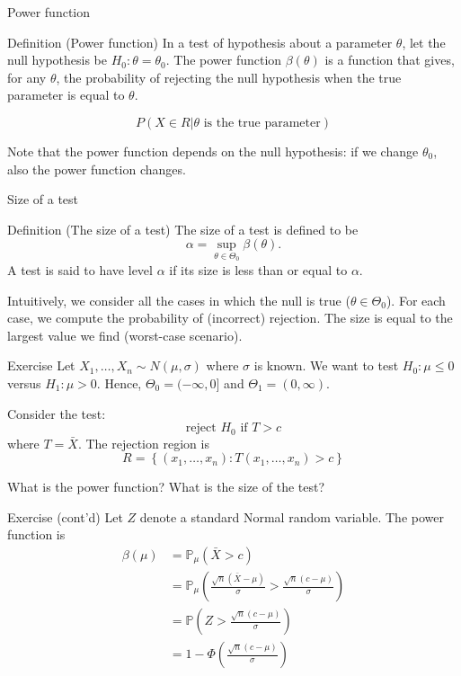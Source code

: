 \documentclass[
  ignorenonframetext,
]{beamer}
\begin{document}
\begin{frame}{Power function}
\protect{}\label{power-function}
\begin{block}{Definition (Power function)}
\protect{}\label{definition-power-function}
In a test of hypothesis about a parameter \(\theta\), let the null
hypothesis be \(H_0:\theta = \theta_0\). The power function
\(\beta(\theta)\) is a function that gives, for any \(\theta\), the
probability of rejecting the null hypothesis when the true parameter is
equal to \(\theta\).

\[
P(X\in R |\theta \text{ is the true parameter})
\]
\end{block}

Note that the power function depends on the null hypothesis: if we
change \(\theta_0\), also the power function changes.
\end{frame}

\begin{frame}{Size of a test}
\protect{}\label{size-of-a-test}
\begin{block}{Definition (The size of a test)}
\protect{}\label{definition-the-size-of-a-test}
The size of a test is defined to be \[
\alpha=\sup _{\theta \in \Theta_{0}} \beta(\theta) .
\] A test is said to have level \(\alpha\) if its size is less than or
equal to \(\alpha\).
\end{block}

Intuitively, we consider all the cases in which the null is true
(\(\theta \in \Theta_{0}\)). For each case, we compute the probability
of (incorrect) rejection. The size is equal to the largest value we find
(worst-case scenario).
\end{frame}

\begin{frame}{Exercise}
\protect{}\label{exercise}
Let \(X_{1}, \ldots, X_{n} \sim N(\mu, \sigma)\) where \(\sigma\) is
known. We want to test \(H_{0}: \mu \leq 0\) versus \(H_{1}: \mu>0\).
Hence, \(\Theta_{0}=(-\infty, 0]\) and \(\Theta_{1}=(0, \infty)\).

Consider the test: \[ \text{reject } H_{0} \text{ if } T>c \] where
\(T=\bar{X}\). The rejection region is \[
R=\left\{\left(x_{1}, \ldots, x_{n}\right): T\left(x_{1}, \ldots, x_{n}\right)>c\right\}
\]

What is the power function? What is the size of the test?
\end{frame}

\begin{frame}{Exercise (cont'd)}
\protect{}\label{exercise-contd}
Let \(Z\) denote a standard Normal random variable. The power function
is \[
\begin{aligned}
\beta(\mu) &=\mathbb{P}_{\mu}(\bar{X}>c) \\
&=\mathbb{P}_{\mu}\left(\frac{\sqrt{n}(\bar{X}-\mu)}{\sigma}>\frac{\sqrt{n}(c-\mu)}{\sigma}\right) \\
&=\mathbb{P}\left(Z>\frac{\sqrt{n}(c-\mu)}{\sigma}\right) \\
&=1-\Phi\left(\frac{\sqrt{n}(c-\mu)}{\sigma}\right)
\end{aligned}
\]
\end{frame}
\end{document}
